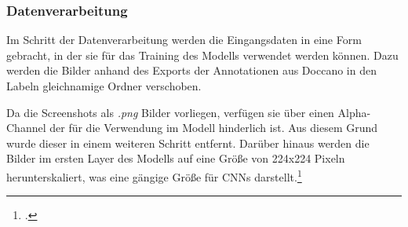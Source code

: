 \subsubsection{Datenverarbeitung} \label{subsubsec_class_datenverarbeitung}
Im Schritt der Datenverarbeitung werden die Eingangsdaten in eine Form gebracht, in der sie für das Training des Modells verwendet werden können.
Dazu werden die Bilder anhand des Exports der Annotationen aus Doccano in den Labeln gleichnamige Ordner verschoben.

Da die Screenshots als \textit{.png} Bilder vorliegen, verfügen sie über einen Alpha-Channel der für die Verwendung im Modell hinderlich ist.
Aus diesem Grund wurde dieser in einem weiteren Schritt entfernt.
Darüber hinaus werden die Bilder im ersten Layer des Modells auf eine Größe von 224x224 Pixeln herunterskaliert, was eine gängige Größe für \aclp{CNN} darstellt.\footcite[\vglf][]{ghosh2019}


